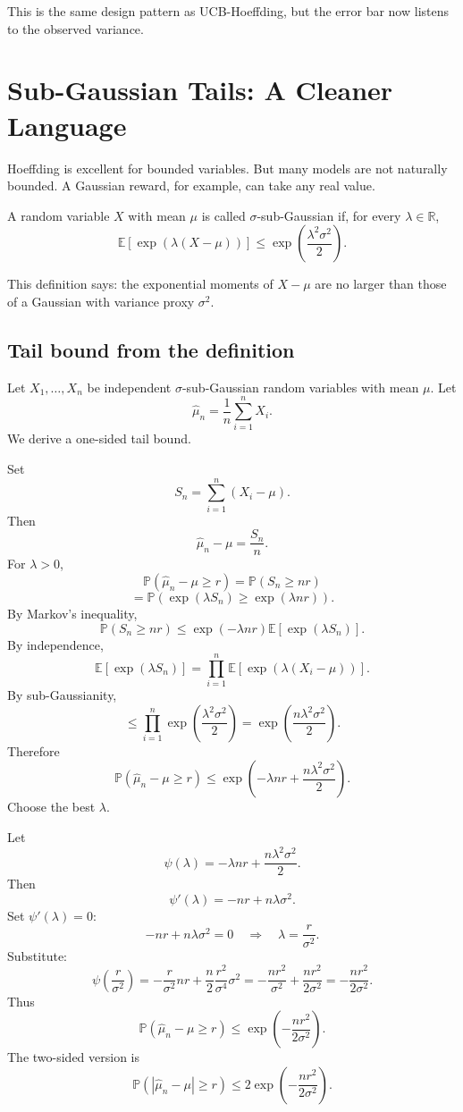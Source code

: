 \documentclass[en,nofont,11pt]{elegantbook}
\newcommand{\E}{\mathbb{E}}
\newcommand{\Pbb}{\mathbb{P}}
\newcommand{\R}{\mathbb{R}}
\begin{document}
This is the same design pattern as UCB-Hoeffding, but the error bar now listens to the observed variance.

\chapter{Sub-Gaussian Tails: A Cleaner Language}

Hoeffding is excellent for bounded variables. But many models are not naturally bounded. A Gaussian reward, for example, can take any real value.

A random variable $X$ with mean $\mu$ is called $\sigma$-sub-Gaussian if, for every $\lambda\in\R$,
\[
\E\left[\exp\left(\lambda(X-\mu)\right)\right]
\le
\exp\left(\frac{\lambda^2\sigma^2}{2}\right).
\]

This definition says: the exponential moments of $X-\mu$ are no larger than those of a Gaussian with variance proxy $\sigma^2$.

\section{Tail bound from the definition}

Let $X_1,\ldots,X_n$ be independent $\sigma$-sub-Gaussian random variables with mean $\mu$. Let
\[
\widehat\mu_n=\frac{1}{n}\sum_{i=1}^{n}X_i.
\]
We derive a one-sided tail bound.

Set
\[
S_n=\sum_{i=1}^{n}(X_i-\mu).
\]
Then
\[
\widehat\mu_n-\mu=\frac{S_n}{n}.
\]
For $\lambda>0$,
\[
\Pbb(\widehat\mu_n-\mu\ge r)
=\Pbb(S_n\ge nr)
\]
\[
=\Pbb(\exp(\lambda S_n)\ge \exp(\lambda nr)).
\]
By Markov's inequality,
\[
\Pbb(S_n\ge nr)
\le
\exp(-\lambda nr)\E[\exp(\lambda S_n)].
\]
By independence,
\[
\E[\exp(\lambda S_n)]
=\prod_{i=1}^{n}\E[\exp(\lambda(X_i-\mu))].
\]
By sub-Gaussianity,
\[
\le
\prod_{i=1}^{n}\exp\left(\frac{\lambda^2\sigma^2}{2}\right)
=
\exp\left(\frac{n\lambda^2\sigma^2}{2}\right).
\]
Therefore
\[
\Pbb(\widehat\mu_n-\mu\ge r)
\le
\exp\left(-\lambda nr+\frac{n\lambda^2\sigma^2}{2}\right).
\]
Choose the best $\lambda$.

Let
\[
\psi(\lambda)=-\lambda nr+\frac{n\lambda^2\sigma^2}{2}.
\]
Then
\[
\psi'(\lambda)=-nr+n\lambda\sigma^2.
\]
Set $\psi'(\lambda)=0$:
\[
-nr+n\lambda\sigma^2=0
\quad\Longrightarrow\quad
\lambda=\frac{r}{\sigma^2}.
\]
Substitute:
\[
\psi\left(\frac{r}{\sigma^2}\right)
= -\frac{r}{\sigma^2}nr
+\frac{n}{2}\frac{r^2}{\sigma^4}\sigma^2
= -\frac{nr^2}{\sigma^2}+\frac{nr^2}{2\sigma^2}
= -\frac{nr^2}{2\sigma^2}.
\]
Thus
\[
\Pbb(\widehat\mu_n-\mu\ge r)
\le
\exp\left(-\frac{nr^2}{2\sigma^2}\right).
\]
The two-sided version is
\[
\Pbb(|\widehat\mu_n-\mu|\ge r)
\le
2\exp\left(-\frac{nr^2}{2\sigma^2}\right).
\]
\end{document}
